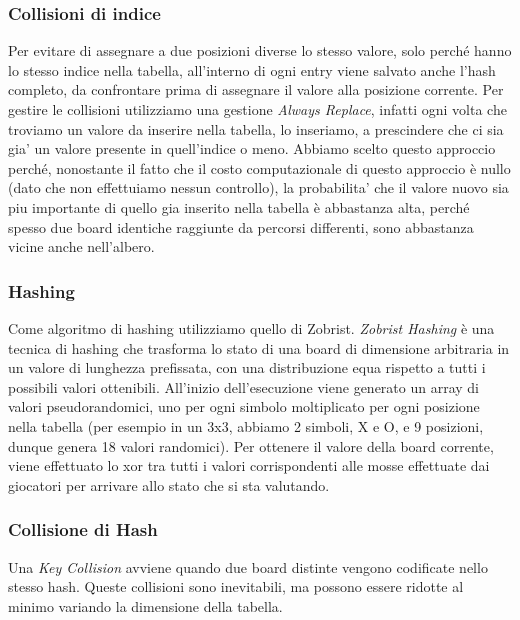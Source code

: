 \documentclass{article}
\begin{document}
\subsubsection{Collisioni di indice}
Per evitare di assegnare a due posizioni diverse lo stesso valore, solo perché hanno lo stesso indice nella tabella, all'interno di ogni entry viene salvato anche l'hash completo, da confrontare prima di assegnare il valore alla posizione corrente. Per gestire le collisioni utilizziamo una gestione \textit{Always Replace}, infatti ogni volta che troviamo un valore da inserire nella tabella, lo inseriamo, a prescindere che ci sia gia' un valore presente in quell'indice o meno. Abbiamo scelto questo approccio perché, nonostante il fatto che il costo computazionale di questo approccio è nullo (dato che non effettuiamo nessun controllo), la probabilita' che il valore nuovo sia piu importante di quello gia inserito nella tabella è abbastanza alta, perché spesso due board identiche raggiunte da percorsi differenti, sono abbastanza vicine anche nell'albero. 

\subsubsection{Hashing}
Come algoritmo di hashing utilizziamo quello di Zobrist.\newline
\textit{Zobrist Hashing} è una tecnica di hashing che trasforma lo stato di una board di dimensione arbitraria in un valore di lunghezza prefissata, con una distribuzione equa rispetto a tutti i possibili valori ottenibili. All'inizio dell'esecuzione viene generato un array di valori pseudorandomici, uno per ogni simbolo moltiplicato per ogni posizione nella tabella (per esempio in un 3x3, abbiamo 2 simboli, X e O, e 9 posizioni, dunque genera 18 valori randomici). Per ottenere il valore della board corrente, viene effettuato lo xor tra tutti i valori corrispondenti alle mosse effettuate dai giocatori per arrivare allo stato che si sta valutando. \newline

\subsubsection{Collisione di Hash}
Una \textit{Key Collision} avviene quando due board distinte vengono codificate nello stesso hash. Queste collisioni sono inevitabili, ma possono essere ridotte al minimo variando la dimensione della tabella.
\end{document}
